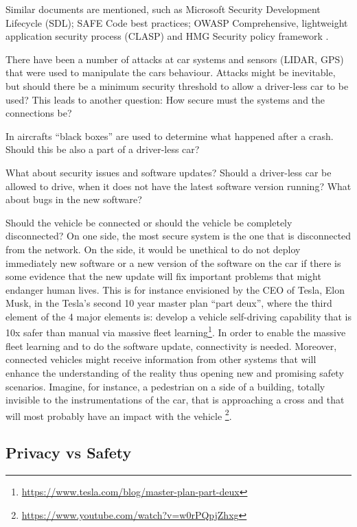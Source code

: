 Similar documents are mentioned, such as Microsoft Security Development Lifecycle (SDL); SAFE Code best practices; OWASP Comprehensive, lightweight application security process (CLASP) and HMG Security policy framework \cite{DepartmentforTransportDfT2017}.

There have been a number of attacks at car systems and sensors (LIDAR, GPS) that were used to manipulate the cars behaviour. Attacks might be inevitable, but should there be a minimum security threshold to allow a driver-less car to be used? This leads to another question: How secure must the systems and the connections be? 

In aircrafts \enquote{black boxes} are used to determine what happened after a crash. Should this be also a part of a driver-less car? 

What about security issues and software updates? Should a driver-less car be allowed to drive, when it does not have the latest software version running? What about bugs in the new software?

Should the vehicle be connected or should the vehicle be completely disconnected? On one side, the most secure system is the one that is disconnected from the network. On the side, it would be unethical to do not deploy immediately new software or a new version of the software on the car if there is some evidence that the new update will fix important problems that might endanger human lives. This is for instance envisioned by the CEO of Tesla, Elon Musk, in the Tesla's second 10 year master plan \enquote{part deux}, where the third element of the 4 major elements is: develop a vehicle self-driving capability that is 10x safer than manual via massive fleet learning\footnote{\url{https://www.tesla.com/blog/master-plan-part-deux}}.
In order to enable the massive fleet learning and to do the software update, connectivity is needed. Moreover, connected vehicles might receive information from other systems that will enhance the understanding of the reality thus opening new and promising safety scenarios. Imagine, for instance, a pedestrian on a side of a building, totally invisible to the instrumentations of the car, that is approaching a cross and that will most probably have an impact with the vehicle \footnote{\url{https://www.youtube.com/watch?v=w0rPQpjZhxg}}. 


\subsection{Privacy vs Safety}
\label{sec:EAofTC:PrivacyVSSafety}

